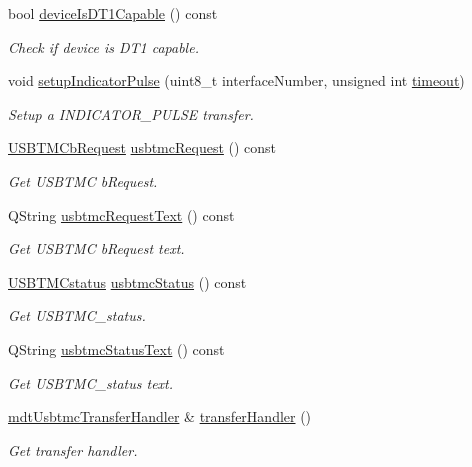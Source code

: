 \begin{DoxyCompactItemize}
bool \hyperlink{classmdt_usbtmc_control_transfer_a3eda1ab8d93a06ff5e75c83aaf809ca4}{device\-Is\-D\-T1\-Capable} () const 
\begin{DoxyCompactList}\small\item\em Check if device is D\-T1 capable. \end{DoxyCompactList}\item 
void \hyperlink{classmdt_usbtmc_control_transfer_af142d729a00688258471d7ef60849cf4}{setup\-Indicator\-Pulse} (uint8\-\_\-t interface\-Number, unsigned int \hyperlink{classmdt_usb_transfer_a3262511f6062348132e7ee689c24226c}{timeout})
\begin{DoxyCompactList}\small\item\em Setup a I\-N\-D\-I\-C\-A\-T\-O\-R\-\_\-\-P\-U\-L\-S\-E transfer. \end{DoxyCompactList}\item 
\hyperlink{classmdt_usbtmc_control_transfer_a9f40cbd57464978b74624c66fa083251}{U\-S\-B\-T\-M\-Cb\-Request} \hyperlink{classmdt_usbtmc_control_transfer_a6fe677f56b8154cf3ee3814a3f818c5d}{usbtmc\-Request} () const 
\begin{DoxyCompactList}\small\item\em Get U\-S\-B\-T\-M\-C b\-Request. \end{DoxyCompactList}\item 
Q\-String \hyperlink{classmdt_usbtmc_control_transfer_ae686c342204cd9880e0dc73af663fd8d}{usbtmc\-Request\-Text} () const 
\begin{DoxyCompactList}\small\item\em Get U\-S\-B\-T\-M\-C b\-Request text. \end{DoxyCompactList}\item 
\hyperlink{classmdt_usbtmc_control_transfer_a9deb98223593f6919b4ecbd87f7e375c}{U\-S\-B\-T\-M\-Cstatus} \hyperlink{classmdt_usbtmc_control_transfer_a44f97e524faa410863d8c5574bf8b076}{usbtmc\-Status} () const 
\begin{DoxyCompactList}\small\item\em Get U\-S\-B\-T\-M\-C\-\_\-status. \end{DoxyCompactList}\item 
Q\-String \hyperlink{classmdt_usbtmc_control_transfer_a47aadf17c8b6e88c1fcebc83c64ff6f3}{usbtmc\-Status\-Text} () const 
\begin{DoxyCompactList}\small\item\em Get U\-S\-B\-T\-M\-C\-\_\-status text. \end{DoxyCompactList}\item 
\hyperlink{classmdt_usbtmc_transfer_handler}{mdt\-Usbtmc\-Transfer\-Handler} \& \hyperlink{classmdt_usbtmc_control_transfer_a1f76ab4314ad2fd174f70af06ee8ce41}{transfer\-Handler} ()
\begin{DoxyCompactList}\small\item\em Get transfer handler. \end{DoxyCompactList}\end{DoxyCompactItemize}
